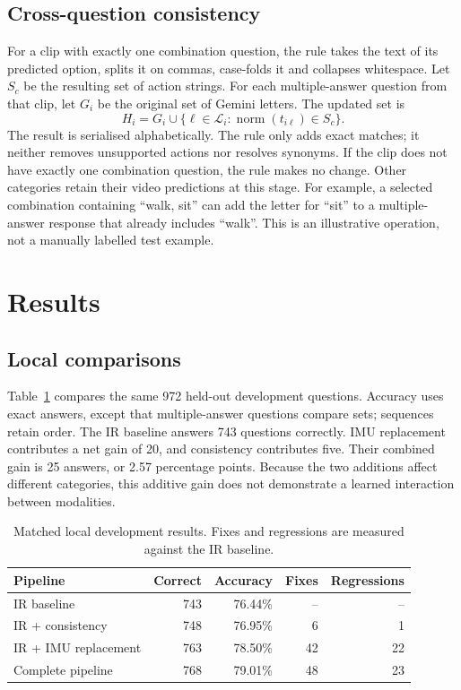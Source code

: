 \documentclass[12pt,a4paper]{article}
\begin{document}
\subsection{Cross-question consistency}
For a clip with exactly one combination question, the rule takes the text of its predicted option, splits it on commas, case-folds it and collapses whitespace. Let $S_c$ be the resulting set of action strings. For each multiple-answer question from that clip, let $G_i$ be the original set of Gemini letters. The updated set is
\begin{equation}
 H_i=G_i\cup\{\ell\in\mathcal{L}_i:\operatorname{norm}(t_{i\ell})\in S_c\}.
\end{equation}
The result is serialised alphabetically. The rule only adds exact matches; it neither removes unsupported actions nor resolves synonyms. If the clip does not have exactly one combination question, the rule makes no change. Other categories retain their video predictions at this stage. For example, a selected combination containing ``walk, sit'' can add the letter for ``sit'' to a multiple-answer response that already includes ``walk''. This is an illustrative operation, not a manually labelled test example.

\section{Results}
\subsection{Local comparisons}
Table~\ref{tab:ablation} compares the same 972 held-out development questions. Accuracy uses exact answers, except that multiple-answer questions compare sets; sequences retain order. The IR baseline answers 743 questions correctly. IMU replacement contributes a net gain of 20, and consistency contributes five. Their combined gain is 25 answers, or 2.57 percentage points. Because the two additions affect different categories, this additive gain does not demonstrate a learned interaction between modalities.

\begin{table}[htbp]
\centering
\caption{Matched local development results. Fixes and regressions are measured against the IR baseline.}
\label{tab:ablation}
\begin{tabular}{@{}lrrrr@{}}
\toprule Pipeline & Correct & Accuracy & Fixes & Regressions \\
\midrule
IR baseline & 743 & 76.44\% & -- & -- \\
IR + consistency & 748 & 76.95\% & 6 & 1 \\
IR + IMU replacement & 763 & 78.50\% & 42 & 22 \\
Complete pipeline & 768 & 79.01\% & 48 & 23 \\
\bottomrule
\end{tabular}
\end{table}
\end{document}
